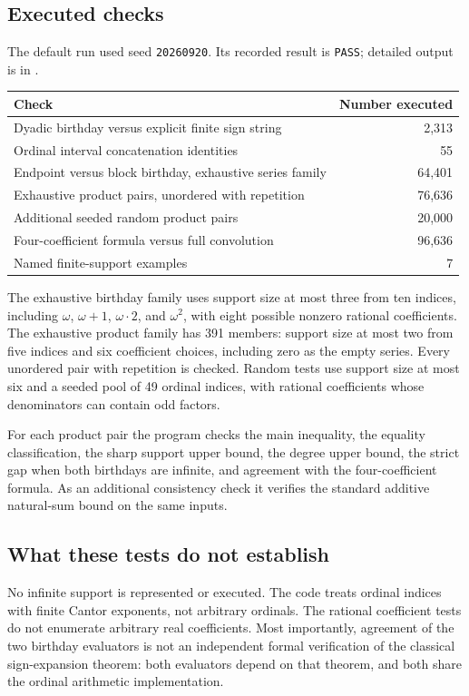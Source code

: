 \documentclass[11pt,letterpaper]{article}
\theoremstyle{definition}
\theoremstyle{remark}
\begin{document}
\subsection{Executed checks}
The default run used seed \texttt{20260920}. Its recorded result is
\texttt{PASS}; detailed output is in .
\begin{center}
\renewcommand{\arraystretch}{1.18}
\begin{tabular}{@{}lr@{}}
\toprule
\textbf{Check} & \textbf{Number executed}\\
\midrule
Dyadic birthday versus explicit finite sign string & 2,313\\
Ordinal interval concatenation identities & 55\\
Endpoint versus block birthday, exhaustive series family & 64,401\\
Exhaustive product pairs, unordered with repetition & 76,636\\
Additional seeded random product pairs & 20,000\\
Four-coefficient formula versus full convolution & 96,636\\
Named finite-support examples & 7\\
\bottomrule
\end{tabular}
\end{center}

The exhaustive birthday family uses support size at most three from ten
indices, including \(\omega\), \(\omega+1\), \(\omega\cdot2\), and
\(\omega^2\), with eight possible nonzero rational coefficients.
The exhaustive product family has 391 members: support size at most two
from five indices and six coefficient choices, including zero as the empty
series. Every unordered pair with repetition is checked. Random tests use
support size at most six and a seeded pool of 49 ordinal indices, with
rational coefficients whose denominators can contain odd factors.

For each product pair the program checks the main inequality, the equality
classification, the sharp support upper bound, the degree upper bound,
the strict gap when both birthdays are infinite, and agreement with the
four-coefficient formula. As an additional consistency check it verifies
the standard additive natural-sum bound on the same inputs.

\subsection{What these tests do not establish}
No infinite support is represented or executed. The code treats ordinal
indices with finite Cantor exponents, not arbitrary ordinals. The rational
coefficient tests do not enumerate arbitrary real coefficients. Most
importantly, agreement of the two birthday evaluators is not an
independent formal verification of the classical sign-expansion theorem:
both evaluators depend on that theorem, and both share the ordinal
arithmetic implementation.
\end{document}
